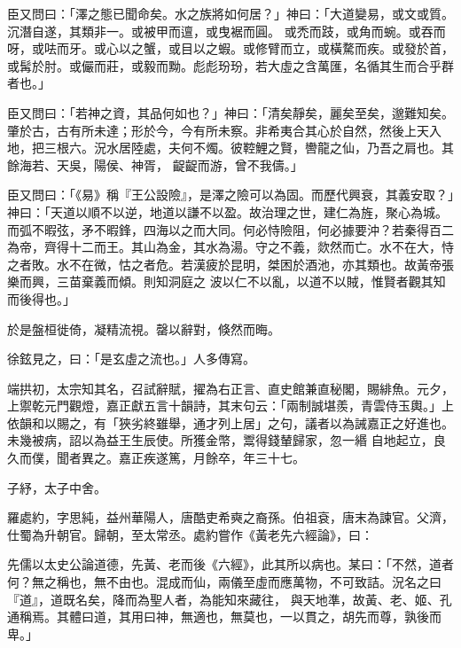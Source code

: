 \begin{pinyinscope}
 臣又問曰：「澤之態已聞命矣。水之族將如何居？」神曰：「大道變易，或文或質。沉潛自遂，其類非一。或被甲而邅，或曳裾而圓。
 或禿而跂，或角而蜿。或吞而呀，或呿而牙。或心以之蟹，或目以之蝦。或修臂而立，或橫騖而疾。或發於首，或髯於肘。或儼而莊，或毅而黝。彪彪玢玢，若大虛之含萬匯，名循其生而合乎群者也。」



 臣又問曰：「若神之資，其品何如也？」神曰：「清矣靜矣，麗矣至矣，邈難知矣。肇於古，古有所未達；形於今，今有所未察。非希夷合其心於自然，然後上天入地，把三根六。況水居陸處，夫何不燭。彼鞚鯉之賢，轡龍之仙，乃吾之肩也。其餘海若、天吳，陽侯、神胥，
 齪齪而游，曾不我儔。」



 臣又問曰：「《易》稱『王公設險』，是澤之險可以為固。而歷代興衰，其義安取？」神曰：「天道以順不以逆，地道以謙不以盈。故治理之世，建仁為旌，聚心為城。而弧不暇弦，矛不暇鋒，四海以之而大同。何必恃險阻，何必據要沖？若秦得百二為帝，齊得十二而王。其山為金，其水為湯。守之不義，欻然而亡。水不在大，恃之者敗。水不在微，怙之者危。若漢疲於昆明，桀困於酒池，亦其類也。故黃帝張樂而興，三苗棄義而傾。則知洞庭之
 波以仁不以亂，以道不以賊，惟賢者觀其知而後得也。」



 於是盤桓徙倚，凝精流視。罄以辭對，倏然而晦。



 徐鉉見之，曰：「是玄虛之流也。」人多傳寫。



 端拱初，太宗知其名，召試辭賦，擢為右正言、直史館兼直秘閣，賜緋魚。元夕，上禦乾元門觀燈，嘉正獻五言十韻詩，其末句云：「兩制誠堪羨，青雲侍玉輿。」上依韻和以賜之，有「狹劣終雖舉，通才列上居」之句，議者以為誡嘉正之好進也。未幾被病，詔以為益王生辰使。所獲金幣，鬻得錢輦歸家，忽一緡
 自地起立，良久而僕，聞者異之。嘉正疾遂篤，月餘卒，年三十七。



 子紓，太子中舍。



 羅處約，字思純，益州華陽人，唐酷吏希奭之裔孫。伯祖袞，唐末為諫官。父濟，仕蜀為升朝官。歸朝，至太常丞。處約嘗作《黃老先六經論》，曰：



 先儒以太史公論道德，先黃、老而後《六經》，此其所以病也。某曰：「不然，道者何？無之稱也，無不由也。混成而仙，兩儀至虛而應萬物，不可致詰。況名之曰『道』，道既名矣，降而為聖人者，為能知來藏往，
 與天地準，故黃、老、姬、孔通稱焉。其體曰道，其用曰神，無適也，無莫也，一以貫之，胡先而尊，孰後而卑。」




\end{pinyinscope}

